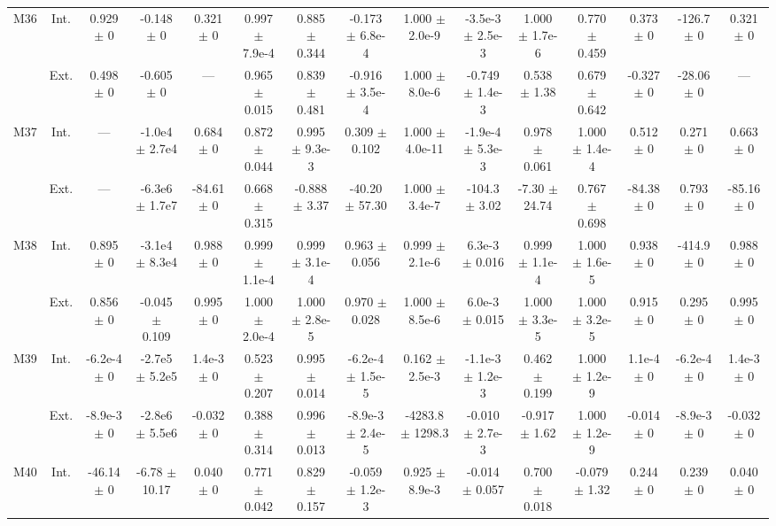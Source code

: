 \begin{table}[htbp]
{\begin{tabular}{@{}ccccccccccccccc@{}}
\cline{2-15}
\multirow{2}{*}{M36} & Int. & 0.929 $\pm$ 0 & -0.148 $\pm$ 0 & 0.321 $\pm$ 0 & 0.997 $\pm$ 7.9e-4 & 0.885 $\pm$ 0.344 & -0.173 $\pm$ 6.8e-4 & 1.000 $\pm$ 2.0e-9 & -3.5e-3 $\pm$ 2.5e-3 & 1.000 $\pm$ 1.7e-6 & 0.770 $\pm$ 0.459 & 0.373 $\pm$ 0 & -126.7 $\pm$ 0 & 0.321 $\pm$ 0 \\
 & Ext. & 0.498 $\pm$ 0 & -0.605 $\pm$ 0 & --- & 0.965 $\pm$ 0.015 & 0.839 $\pm$ 0.481 & -0.916 $\pm$ 3.5e-4 & 1.000 $\pm$ 8.0e-6 & -0.749 $\pm$ 1.4e-3 & 0.538 $\pm$ 1.38 & 0.679 $\pm$ 0.642 & -0.327 $\pm$ 0 & -28.06 $\pm$ 0 & --- \\
\cline{2-15}
\multirow{2}{*}{M37} & Int. & --- & -1.0e4 $\pm$ 2.7e4 & 0.684 $\pm$ 0 & 0.872 $\pm$ 0.044 & 0.995 $\pm$ 9.3e-3 & 0.309 $\pm$ 0.102 & 1.000 $\pm$ 4.0e-11 & -1.9e-4 $\pm$ 5.3e-3 & 0.978 $\pm$ 0.061 & 1.000 $\pm$ 1.4e-4 & 0.512 $\pm$ 0 & 0.271 $\pm$ 0 & 0.663 $\pm$ 0 \\
 & Ext. & --- & -6.3e6 $\pm$ 1.7e7 & -84.61 $\pm$ 0 & 0.668 $\pm$ 0.315 & -0.888 $\pm$ 3.37 & -40.20 $\pm$ 57.30 & 1.000 $\pm$ 3.4e-7 & -104.3 $\pm$ 3.02 & -7.30 $\pm$ 24.74 & 0.767 $\pm$ 0.698 & -84.38 $\pm$ 0 & 0.793 $\pm$ 0 & -85.16 $\pm$ 0 \\
\cline{2-15}
\multirow{2}{*}{M38} & Int. & 0.895 $\pm$ 0 & -3.1e4 $\pm$ 8.3e4 & 0.988 $\pm$ 0 & 0.999 $\pm$ 1.1e-4 & 0.999 $\pm$ 3.1e-4 & 0.963 $\pm$ 0.056 & 0.999 $\pm$ 2.1e-6 & 6.3e-3 $\pm$ 0.016 & 0.999 $\pm$ 1.1e-4 & 1.000 $\pm$ 1.6e-5 & 0.938 $\pm$ 0 & -414.9 $\pm$ 0 & 0.988 $\pm$ 0 \\
 & Ext. & 0.856 $\pm$ 0 & -0.045 $\pm$ 0.109 & 0.995 $\pm$ 0 & 1.000 $\pm$ 2.0e-4 & 1.000 $\pm$ 2.8e-5 & 0.970 $\pm$ 0.028 & 1.000 $\pm$ 8.5e-6 & 6.0e-3 $\pm$ 0.015 & 1.000 $\pm$ 3.3e-5 & 1.000 $\pm$ 3.2e-5 & 0.915 $\pm$ 0 & 0.295 $\pm$ 0 & 0.995 $\pm$ 0 \\
\cline{2-15}
\multirow{2}{*}{M39} & Int. & -6.2e-4 $\pm$ 0 & -2.7e5 $\pm$ 5.2e5 & 1.4e-3 $\pm$ 0 & 0.523 $\pm$ 0.207 & 0.995 $\pm$ 0.014 & -6.2e-4 $\pm$ 1.5e-5 & 0.162 $\pm$ 2.5e-3 & -1.1e-3 $\pm$ 1.2e-3 & 0.462 $\pm$ 0.199 & 1.000 $\pm$ 1.2e-9 & 1.1e-4 $\pm$ 0 & -6.2e-4 $\pm$ 0 & 1.4e-3 $\pm$ 0 \\
 & Ext. & -8.9e-3 $\pm$ 0 & -2.8e6 $\pm$ 5.5e6 & -0.032 $\pm$ 0 & 0.388 $\pm$ 0.314 & 0.996 $\pm$ 0.013 & -8.9e-3 $\pm$ 2.4e-5 & -4283.8 $\pm$ 1298.3 & -0.010 $\pm$ 2.7e-3 & -0.917 $\pm$ 1.62 & 1.000 $\pm$ 1.2e-9 & -0.014 $\pm$ 0 & -8.9e-3 $\pm$ 0 & -0.032 $\pm$ 0 \\
\cline{2-15}
\multirow{2}{*}{M40} & Int. & -46.14 $\pm$ 0 & -6.78 $\pm$ 10.17 & 0.040 $\pm$ 0 & 0.771 $\pm$ 0.042 & 0.829 $\pm$ 0.157 & -0.059 $\pm$ 1.2e-3 & 0.925 $\pm$ 8.9e-3 & -0.014 $\pm$ 0.057 & 0.700 $\pm$ 0.018 & -0.079 $\pm$ 1.32 & 0.244 $\pm$ 0 & 0.239 $\pm$ 0 & 0.040 $\pm$ 0 \\

\end{tabular}}
\end{table}
